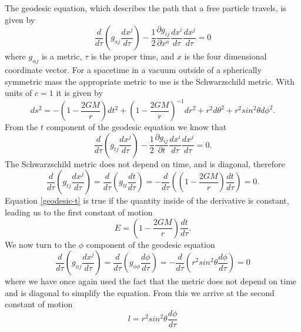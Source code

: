 \documentclass[a4paper,12pt]{article}
\begin{document}
The geodesic equation, which describes the path that a free particle travels, is given by
\begin{equation} \label{geodesic}
\frac{d}{d\tau} \left(g_{aj} \frac{dx^j}{d\tau} \right)-\frac{1}{2}\frac{\partial g_{ij}}{\partial x^a} \frac{dx^i}{d\tau}\frac{dx^j}{d\tau} = 0
\end{equation}
where $g_{\alpha j}$ is a metric, $\tau$ is the proper time, and $x$ is the four dimensional coordinate vector. For a spacetime in a vacuum outside of a spherically symmetric mass the appropriate metric to use is the Schwarzschild metric.  With units of $c=1$ it is given by
\begin{equation} \label{s-metric}
ds^2 = -\left(1-\frac{2GM}{r}\right)dt^2 + \left(1-\frac{2GM}{r}\right)^{-1}dr^2+r^2 d \theta^2 + r^2 sin^2 \theta d\phi^2.
\end{equation}
From the $t$ component of the geodesic equation we know that
\begin{equation} \label{geodesic-t}
\frac{d}{d \tau} \left(g_{tj}\frac{dx^j}{d\tau}\right) - \frac{1}{2} \frac{\partial g_{ij}}{\partial t} \frac{dx^i}{d\tau} \frac{dx^j}{d \tau} =0.
\end{equation}
The Schwarzschild metric does not depend on time, and is diagonal, therefore
\begin{equation} \label{geodesic-t-reduced}
\frac{d}{d \tau} \left(g_{tj}\frac{dx^j}{d\tau} \right) = \frac{d}{d \tau} \left(g_{tt}\frac{dt}{d\tau}\right) = -\frac{d}{d \tau}\left( \left(1-\frac{2GM}{r}\right)\frac{dt}{d\tau}\right) = 0.
\end{equation}
Equation \ref{geodesic-t} is true if the quantity inside of the derivative is constant, leading us to the first constant of motion
\begin{equation}\label{first com}
E=\left(1-\frac{2GM}{r}\right)\frac{dt}{d\tau}.
\end{equation}
We now turn to the $\phi$ component of the geodesic equation
\begin{equation} \label{geodesic-phi}
\frac{d}{d \tau}\left(g_{\phi j}\frac{dx^j}{d\tau}\right) = \frac{d}{d \tau}\left(g_{\phi \phi}\frac{d\phi}{d\tau}\right) = -\frac{d}{d \tau}\left(r^2 sin^2 \theta \frac{d\phi}{d\tau}\right) = 0
\end{equation}
where we have once again used the fact that the metric does not depend on time and is diagonal to simplify the equation.  From this we arrive at the second constant of motion
\begin{equation} \label{second com}
l=r^2sin^2\theta \frac{d\phi}{d \tau}
\end{equation}
\end{document}
